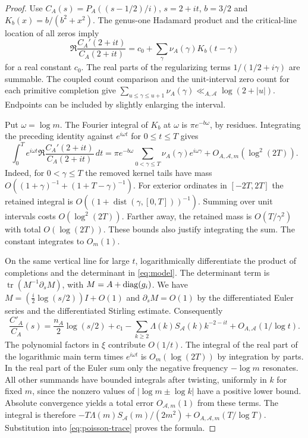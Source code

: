 \begin{proof}
Use $C_A(s)=P_A((s-1/2)/i)$, $s=2+it$, $b=3/2$ and $K_b(x)=b/(b^2+x^2)$. The genus-one Hadamard product and the critical-line location of all zeros imply
\[
 \Re\frac{C_A'(2+it)}{C_A(2+it)}=c_0+\sum_\gamma\nu_A(\gamma)K_b(t-\gamma)
\]
for a real constant $c_0$. The real parts of the regularizing terms $1/(1/2+i\gamma)$ are summable. The coupled count comparison and the unit-interval zero count for each primitive completion give $\sum_{u\le\gamma\le u+1}\nu_A(\gamma)\ll_{A,\mathcal A}\log(2+|u|)$. Endpoints can be included by slightly enlarging the interval.

Put $\omega=\log m$. The Fourier integral of $K_b$ at $\omega$ is $\pi e^{-b\omega}$, by residues. Integrating the preceding identity against $e^{i\omega t}$ for $0\le t\le T$ gives
\begin{equation}\label{eq:poisson-trace}
 \int_0^T e^{i\omega t}\Re\frac{C_A'(2+it)}{C_A(2+it)}\,dt
 =\pi e^{-b\omega}\sum_{0<\gamma\le T}\nu_A(\gamma)e^{i\omega\gamma}
 +O_{A,\mathcal A,m}(\log^2(2T)).
\end{equation}
Indeed, for $0<\gamma\le T$ the removed kernel tails have mass $O((1+\gamma)^{-1}+(1+T-\gamma)^{-1})$. For exterior ordinates in $[-2T,2T]$ the retained integral is $O((1+\operatorname{dist}(\gamma,[0,T]))^{-1})$. Summing over unit intervals costs $O(\log^2(2T))$. Farther away, the retained mass is $O(T/\gamma^2)$ with total $O(\log(2T))$. These bounds also justify integrating the sum. The constant integrates to $O_m(1)$.

On the same vertical line for large $t$, logarithmically differentiate the product of completions and the determinant in \eqref{eq:model}. The determinant term is $\operatorname{tr}(M^{-1}\partial_s M)$, with $M=A+\operatorname{diag}(g_i)$. We have $M=(\tfrac i2\log(s/2))I+O(1)$ and $\partial_s M=O(1)$ by the differentiated Euler series and the differentiated Stirling estimate. Consequently
\[
 \frac{C'_A}{C_A}(s)=\frac{n_A}{2}\log(s/2)+c_1
 -\sum_{k\ge2}\Lambda(k)S_{\mathcal A}(k) k^{-2-it}
 +O_{A,\mathcal A}(1/\log t).
\]
The polynomial factors in $\xi$ contribute $O(1/t)$. The integral of the real part of the logarithmic main term times $e^{i\omega t}$ is $O_m(\log(2T))$ by integration by parts. In the real part of the Euler sum only the negative frequency $-\log m$ resonates. All other summands have bounded integrals after twisting, uniformly in $k$ for fixed $m$, since the nonzero values of $|\log m\pm\log k|$ have a positive lower bound. Absolute convergence yields a total error $O_{\mathcal A,m}(1)$ from these terms. The integral is therefore $-T\Lambda(m)S_{\mathcal A}(m)/(2m^2)+O_{A,\mathcal A,m}(T/\log T)$. Substitution into \eqref{eq:poisson-trace} proves the formula.
\end{proof}

